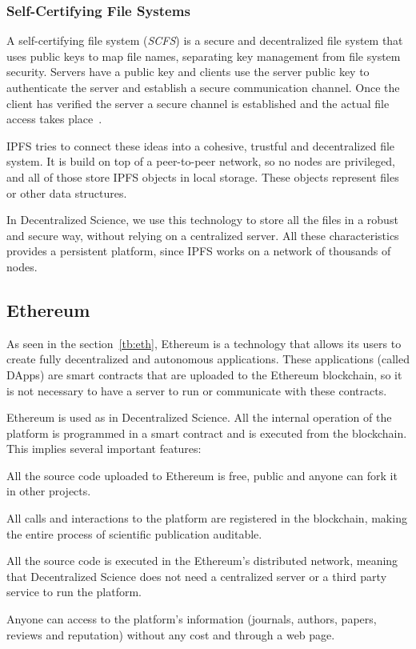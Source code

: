 \subsubsection*{Self-Certifying File Systems}
\label{tech:sec:ipfs:scfs}

A self-certifying file system (\emph{SCFS}) is a secure and decentralized file
system that uses public keys to map file names, separating key management from
file system security. Servers have a public key and clients use the server
public key to authenticate the server and establish a secure communication
channel. Once the client has verified the server a secure channel is established
and the actual file access takes place~\cite{mazieres2000self}.

IPFS tries to connect these ideas into a cohesive, trustful and decentralized
file system. It is build on top of a peer-to-peer network, so no nodes are
privileged, and all of those store IPFS objects in local storage. These objects
represent files or other data structures.

In Decentralized Science, we use this technology to store all the files in a
robust and secure way, without relying on a centralized server. All these
characteristics provides a persistent platform, since IPFS works on a network of
thousands of nodes.

\subsection{Ethereum}
\label{tech:sec:ethereum}

As seen in the section~\ref{tb:eth}, Ethereum is a technology that allows its
users to create fully decentralized and autonomous applications. These
applications (called DApps) are smart contracts that are uploaded to the
Ethereum blockchain, so it is not necessary to have a server to run or
communicate with these contracts.

Ethereum is used as  in Decentralized Science. All the internal
operation of the platform is programmed in a smart contract and is executed from
the blockchain. This implies several important features:

\begin{itemize}
   All the source code uploaded to Ethereum is free, public
  and anyone can fork it in other projects.

   All calls and interactions to the platform are
  registered in the blockchain, making the entire process of scientific
  publication auditable.

   All the source code is executed in the Ethereum's
  distributed network, meaning that Decentralized Science does not need a
  centralized server or a third party service to run the platform.

   Anyone can access to the platform's
  information (journals, authors, papers, reviews and reputation) without any
  cost and through a web page.
\end{itemize}

